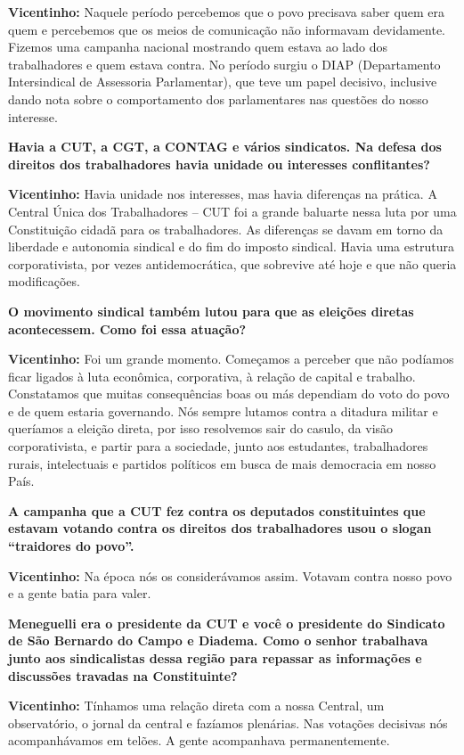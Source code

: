 \textbf{Vicentinho:} Naquele período percebemos que o povo precisava
saber quem era quem e percebemos que os meios de comunicação não
informavam devidamente. Fizemos uma campanha nacional mostrando quem
estava ao lado dos trabalhadores e quem estava contra. No período surgiu
o DIAP (Departamento Intersindical de Assessoria Parlamentar), que teve
um papel decisivo, inclusive dando nota sobre o comportamento dos
parlamentares nas questões do nosso interesse.

\textbf{Havia a CUT, a CGT, a CONTAG e vários sindicatos. Na defesa dos
direitos dos trabalhadores havia unidade ou interesses conflitantes?}

\textbf{Vicentinho:} Havia unidade nos interesses, mas havia diferenças
na prática. A Central Única dos Trabalhadores -- CUT foi a grande
baluarte nessa luta por uma Constituição cidadã para os trabalhadores.
As diferenças se davam em torno da liberdade e autonomia sindical e do
fim do imposto sindical. Havia uma estrutura corporativista, por vezes
antidemocrática, que sobrevive até hoje e que não queria modificações.

\textbf{O movimento sindical também lutou para que as eleições diretas
acontecessem. Como foi essa atuação?}

\textbf{Vicentinho:} Foi um grande momento. Começamos a perceber que não
podíamos ficar ligados à luta econômica, corporativa, à relação de
capital e trabalho. Constatamos que muitas consequências boas ou más
dependiam do voto do povo e de quem estaria governando. Nós sempre
lutamos contra a ditadura militar e queríamos a eleição direta, por isso
resolvemos sair do casulo, da visão corporativista, e partir para a
sociedade, junto aos estudantes, trabalhadores rurais, intelectuais e
partidos políticos em busca de mais democracia em nosso País.

\textbf{A campanha que a CUT fez contra os deputados constituintes que
estavam votando contra os direitos dos trabalhadores usou o slogan
``traidores do povo''.}

\textbf{Vicentinho:} Na época nós os considerávamos assim. Votavam
contra nosso povo e a gente batia para valer.

\textbf{Meneguelli era o presidente da CUT e você o presidente do
Sindicato de São Bernardo do Campo e Diadema. Como o senhor trabalhava
junto aos sindicalistas dessa região para repassar as informações e
discussões travadas na Constituinte?}

\textbf{Vicentinho:} Tínhamos uma relação direta com a nossa Central, um
observatório, o jornal da central e fazíamos plenárias. Nas votações
decisivas nós acompanhávamos em telões. A gente acompanhava
permanentemente.

